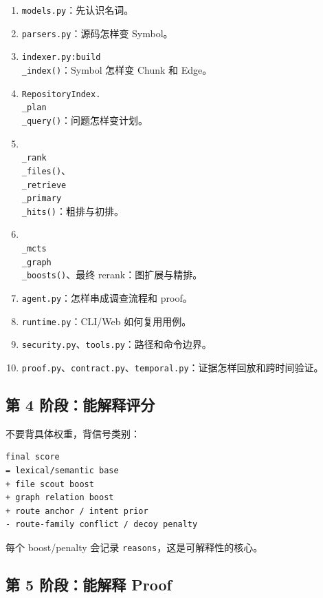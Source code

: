\documentclass[UTF8,12pt,openany]{ctexbook}
\begin{document}
\begin{enumerate}
\item \texttt{models.py}：先认识名词。
\item \texttt{parsers.py}：源码怎样变 Symbol。
\item \texttt{indexer.py:build\\_index()}：Symbol 怎样变 Chunk 和 Edge。
\item \texttt{RepositoryIndex.\\_plan\\_query()}：问题怎样变计划。
\item \texttt{\\_rank\\_files()}、\texttt{\\_retrieve\\_primary\\_hits()}：粗排与初排。
\item \texttt{\\_mcts\\_graph\\_boosts()}、最终 rerank：图扩展与精排。
\item \texttt{agent.py}：怎样串成调查流程和 proof。
\item \texttt{runtime.py}：CLI/Web 如何复用用例。
\item \texttt{security.py}、\texttt{tools.py}：路径和命令边界。
\item \texttt{proof.py}、\texttt{contract.py}、\texttt{temporal.py}：证据怎样回放和跨时间验证。
\end{enumerate}

\subsection{第 4 阶段：能解释评分}

不要背具体权重，背信号类别：\par

\begin{lstlisting}
final score
= lexical/semantic base
+ file scout boost
+ graph relation boost
+ route anchor / intent prior
- route-family conflict / decoy penalty
\end{lstlisting}

每个 boost/penalty 会记录 \texttt{reasons}，这是可解释性的核心。\par

\subsection{第 5 阶段：能解释 Proof}
\end{document}
